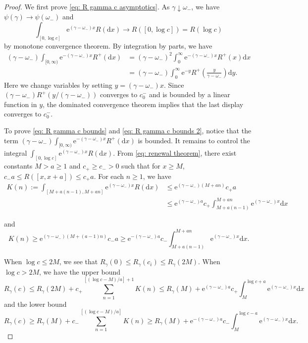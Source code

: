 \documentclass[12pt]{article}
\numberwithin{equation}{section}
\theoremstyle{plain}
\theoremstyle{definition}
\newcommand{\D}{\mathrm{d}}
\begin{document}
\begin{proof}
We first prove \eqref{eq: R gamma c asymptotics}. As $\gamma\downarrow\omega_-$, we have
$\psi(\gamma)\to \psi(\omega_-)$ and
\[\int_{[0, \log c]} \mathrm{e}^{(\gamma-\omega_-)x}R(\mathrm{d}x) \to R([0, \log c]) = R(\log c)\]
\noindent by monotone convergence theorem. By integration by parts, we have
\begin{align*}
    (\gamma-\omega_-)\int_{[0, \infty)} \mathrm{e}^{-(\gamma-\omega_-)x}R^+(\mathrm{d}x) &= (\gamma-\omega_-)^2 \int^{\infty}_0 \mathrm{e}^{-(\gamma-\omega_-)x}R^+(x)\mathrm{d}x \\
&= (\gamma-\omega_-) \int^{\infty}_0 \mathrm{e}^{-y}R^+(\frac{y}{\gamma-\omega_-})\mathrm{d}y.
\end{align*}
\noindent Here we change variables by setting $y = (\gamma-\omega_-)x$. Since $(\gamma-\omega_-)R^+(y/(\gamma-\omega_-))$ converges to $c_0^-$ and is bounded by a linear function in $y$, the dominated convergence theorem implies that the last display converges to $c_0^-$.

To prove \eqref{eq: R gamma c bounds} and \eqref{eq: R gamma c bounds 2}, notice that the term $(\gamma-\omega_-)\int_{[0,\infty)} \mathrm{e}^{-(\gamma-\omega_-)x}R^+(\mathrm{d}x)$ is bounded. It remains to control the integral $\int_{[0, \log c]}\mathrm{e}^{(\gamma-\omega_-)x}R(\D x)$. From \eqref{eq: renewal theorem}, there exist  constants $M>a\ge 1$ and $c_+\ge c_->0$ such that for $x\ge M$, $ c_-a \le  R([x,x+a])\le c_+a$. For each $n\geq 1$, we have
\begin{align*}
    K(n) := \int_{[M+a(n-1), M+an]}\mathrm{e}^{(\gamma-\omega_-)x} R(\D x) &\leq \mathrm{e}^{(\gamma-\omega_-)(M+an)}c_+a\\
   & \leq \mathrm{e}^{(\gamma-\omega_-)a}c_+\int^{M+an}_{M+a(n-1)}\mathrm{e}^{(\gamma-\omega_-)x}\D x
\end{align*}

\noindent and
\[K(n)\geq \mathrm{e}^{(\gamma-\omega_-)(M+(a-1)n)}c_-a\geq \mathrm{e}^{-(\gamma-\omega_-)a}c_-\int^{M+an}_{M+a(n-1)}\mathrm{e}^{(\gamma-\omega_-)x}\D x.\]

\noindent When $\log c\le 2M$, we see that $R_{\gamma}(0)\leq R_{\gamma}(c_i)\leq R_{\gamma}(2M)$. When $\log c>2M$, we have the upper bound
\begin{equation}\label{eq: R gamma upper bound}
R_{\gamma}(c)\leq R_{\gamma}(2M)+c_+\sum_{n=1}^{[(\log c-M)/a]+1}K(n)
\le  R_{\gamma}(M)+ \mathrm{e}^{(\gamma-\omega_-)a}c_+\int^{\log c+a}_{M} \mathrm{e}^{(\gamma-\omega_-)x}\D x
\end{equation}
\noindent and the lower bound
\begin{equation}\label{eq: R gamma lower bound}
    R_{\gamma}(c)\ge R_{\gamma}(M)+c_-\sum_{n=1}^{[(\log c-M)/a]}K(n)\ge R_{\gamma}(M)+\mathrm{e}^{-(\gamma-\omega_-)a}c_-\int^{\log c-a}_{M} \mathrm{e}^{(\gamma-\omega_-)x}\D x.
\end{equation}


\end{proof}
\end{document}
